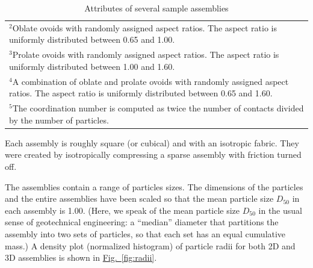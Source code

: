 \documentclass[letterpaper,11pt]{article}
\begin{document}
\begin{table}
\begin{tabular}{lccccc}
\multicolumn{6}{l}{\parbox{4.80in}{%
$^{2} $Oblate ovoids with randomly assigned aspect ratios.  
The aspect ratio is uniformly distributed between 0.65 and 1.00.%
}}\\
\multicolumn{6}{l}{\parbox{4.80in}{%
$^{3} $Prolate ovoids with randomly assigned aspect ratios.
The aspect ratio is uniformly distributed between 1.00 and 1.60.%
}}\\
\multicolumn{6}{l}{\parbox{4.80in}{%
$^{4} $A combination of oblate and prolate ovoids with 
randomly assigned aspect ratios.
The aspect ratio is uniformly distributed between 0.65 and 1.60.%
}}\\
\multicolumn{6}{l}{\parbox{4.80in}{%
$^{5} $The coordination number is computed as twice the number of contacts
divided by the number of particles.
}}\\
\hline
\hline
\end{tabular}
\caption{Attributes of several sample assemblies}
\label{table:assemblies}
\end{table}
Each assembly is roughly square (or cubical)
and with an isotropic fabric.
They were created by isotropically compressing a sparse assembly with
friction turned off.
\par
The assemblies contain a range of particles sizes.
The dimensions of the particles and the entire assemblies have
been scaled so that the mean particle size 
$D_{50}$ in each assembly is 1.00.
(\label{page:d50}Here, 
we speak of the mean particle size $D_{50}$ in the usual sense
of geotechnical engineering:  a ``median'' diameter that partitions
the assembly into two sets of particles, so that each set has an equal
cumulative mass.)
A density plot (normalized histogram) of 
particle radii for both 2D and 3D assemblies is shown
in \hyperref[fig:radii]{Fig.~\ref*{fig:radii}}.
%
\end{document}
